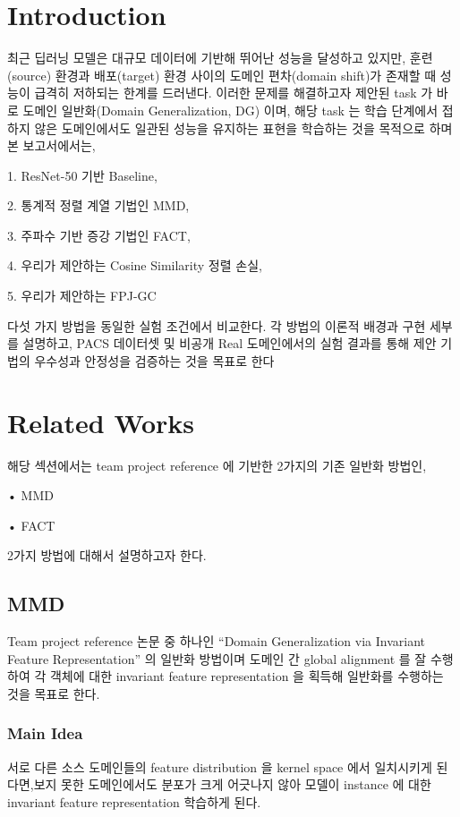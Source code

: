 \section{Introduction}
\label{sec:intro}

최근 딥러닝 모델은 대규모 데이터에 기반해 뛰어난 성능을 달성하고 있지만, 훈련(source) 환경과 배포(target) 환경 사이의 도메인 편차(domain shift)가 존재할 때 성능이 급격히 저하되는 한계를 드러낸다. 이러한 문제를 해결하고자 제안된 task 가 바로 도메인 일반화(Domain Generalization, DG) 이며, 해당 task 는 학습 단계에서 접하지 않은 도메인에서도 일관된 성능을 유지하는 표현을 학습하는 것을 목적으로 하며 본 보고서에서는,



1. ResNet-50 기반 Baseline,

2. 통계적 정렬 계열 기법인 MMD,

3. 주파수 기반 증강 기법인 FACT,

4. 우리가 제안하는 Cosine Similarity 정렬 손실,


5. 우리가 제안하는 FPJ-GC


다섯 가지 방법을 동일한 실험 조건에서 비교한다. 각 방법의 이론적 배경과 구현 세부를 설명하고, PACS 데이터셋 및 비공개 Real 도메인에서의 실험 결과를 통해 제안 기법의 우수성과 안정성을 검증하는 것을 목표로 한다

\section{Related Works}

해당 섹션에서는 team project reference 에 기반한 2가지의 기존 일반화 방법인, 

•  MMD

•  FACT

2가지 방법에 대해서 설명하고자 한다.

\subsection{MMD}

Team project reference 논문 중 하나인 “Domain Generalization via Invariant Feature Representation” 의 일반화 방법이며 도메인 간 global alignment 를 잘 수행하여 각 객체에 대한 invariant feature representation 을 획득해 일반화를 수행하는 것을 목표로 한다.

\subsubsection{Main Idea}
서로 다른 소스 도메인들의 feature distribution 을 kernel space 에서 일치시키게 된다면,보지 못한 도메인에서도 분포가 크게 어긋나지 않아 모델이 instance 에 대한 invariant feature representation 학습하게 된다.

